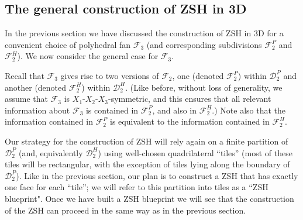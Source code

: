 \documentclass[12pt,letterpaper]{article}
\begin{document}
%






\bigskip


\subsection{The general construction of ZSH in 3D}
\label{section:3d_ZSH_in_general}

In the previous section we have discussed the construction of ZSH in 3D for a convenient choice of polyhedral fan $\mathcal{F}_3$ (and corresponding subdivisions $\mathcal{F}_2^P$ and $\mathcal{F}_2^H$). We now consider the  general case for $\mathcal{F}_3$. 

Recall that $\mathcal{F}_3$ gives rise to two versions of $\mathcal{F}_2$, one (denoted $\mathcal{F}_2^P$) within $\mathscr{D}_2^P$ and another (denoted $\mathcal{F}_2^H$) within $\mathscr{D}_2^H$. (Like before, without loss of generality, we assume that $\mathcal{F}_3$ is $X_1$-$X_2$-$X_3$-symmetric, and this ensures that all relevant information about $\mathcal{F}_3$ is contained in $\mathcal{F}_2^P$, and also in $\mathcal{F}_2^H$.) Note also that the information contained in $\mathcal{F}_2^P$ is equivalent to the information contained in $\mathcal{F}_2^H$. 

Our strategy for the construction of ZSH will rely again on a finite partition of $\mathscr{D}_2^P$ (and, equivalently $\mathscr{D}_2^H$) using well-chosen quadrilateral ``tiles'' (most of these tiles will be rectangular, with the exception of tiles lying along the boundary of $\mathscr{D}_2^P$). Like in the previous section, our plan is to construct a ZSH that has exactly one face for each ``tile''; we will refer to this partition into tiles as a ``ZSH blueprint". Once we have built a ZSH blueprint we will see that the construction of the ZSH can proceed in the same way as in the previous section. 
\end{document}
